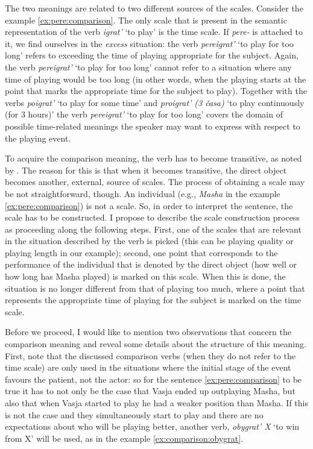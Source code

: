 The two meanings are related to two different sources of the scales. Consider the example \ref{ex:pere:comparison}. The only scale that is present in the semantic representation of the verb \textit{igrat'} `to play' is the time scale. If \textit{pere-} is attached to it, we find ourselves in the \textit{excess} situation: the verb \textit{pereigrat'} `to play for too long' refers to exceeding the time of playing appropriate for the subject. Again, the verb \textit{pereigrat'} `to play for too long' cannot refer to a situation where any time of playing would be too long (in other words, when the playing starts at the point that marks the appropriate time for the subject to play). Together with the verbs \textit{poigrat'} `to play for some time' and \textit{proigrat' (3 \v{c}asa)} `to play continuously (for 3 hours)' the verb \textit{pereigrat'} `to play for too long' covers the domain of possible time-related meanings the speaker may want to express with respect to the playing event.

To acquire the comparison meaning, the verb has to become transitive, as noted by \citet{Shvedova:82}. The reason for this is that when it becomes transitive, the direct object becomes another, external, source of scales. The process of obtaining a scale may be not straightforward, though. An individual (e.g., \textit{Masha} in the example \ref{ex:pere:comparison}) is not a scale. So, in order to interpret the sentence, the scale has to be constructed. I propose to describe the scale construction process as proceeding along the following steps. First, one of the scales that are relevant in the situation described by the verb is picked (this can be playing quality or playing length in our example); second, one point that corresponds to the performance of the individual that is denoted by the direct object (how well or how long has Masha played) is marked on this scale. When this is done, the situation is no longer different from that of playing too much, where a point that represents the appropriate time of playing for the subject is marked on the time scale.

Before we proceed, I would like to mention two observations that concern the comparison meaning and reveal some details about the structure of this meaning. First, note that the discussed comparison verbs (when they do not refer to the time scale) are only used in the situations where the initial stage of the event favours the patient, not the actor: so for the sentence \ref{ex:pere:comparison} to be true it has to not only be the case that Vasja ended up outplaying Masha, but also that when Vasja started to play he had a weaker position than Masha. If this is not the case and they simultaneously start to play and there are no expectations about who will be playing better, another verb, \textit{obygrat' X} `to win from X' will be used, as in the example \ref{ex:comparison:obygrat}. 

